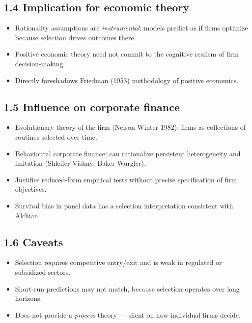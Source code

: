 \documentclass[11pt]{article}
\begin{document}
\subsection*{1.4 Implication for economic theory}
\begin{itemize}
\item Rationality assumptions are \emph{instrumental}: models predict as if firms optimize because selection drives outcomes there.
\item Positive economic theory need not commit to the cognitive realism of firm decision-making.
\item Directly foreshadows Friedman (1953) methodology of positive economics.
\end{itemize}

\subsection*{1.5 Influence on corporate finance}
\begin{itemize}
\item Evolutionary theory of the firm (Nelson-Winter 1982): firms as collections of routines selected over time.
\item Behavioural corporate finance: can rationalize persistent heterogeneity and imitation (Shleifer-Vishny; Baker-Wurgler).
\item Justifies reduced-form empirical tests without precise specification of firm objectives.
\item Survival bias in panel data has a selection interpretation consistent with Alchian.
\end{itemize}

\subsection*{1.6 Caveats}
\begin{alertbox}
\begin{itemize}
\item Selection requires competitive entry/exit and is weak in regulated or subsidized sectors.
\item Short-run predictions may not match, because selection operates over long horizons.
\item Does not provide a \emph{process} theory --- silent on how individual firms decide.
\end{itemize}
\end{alertbox}
\end{document}
